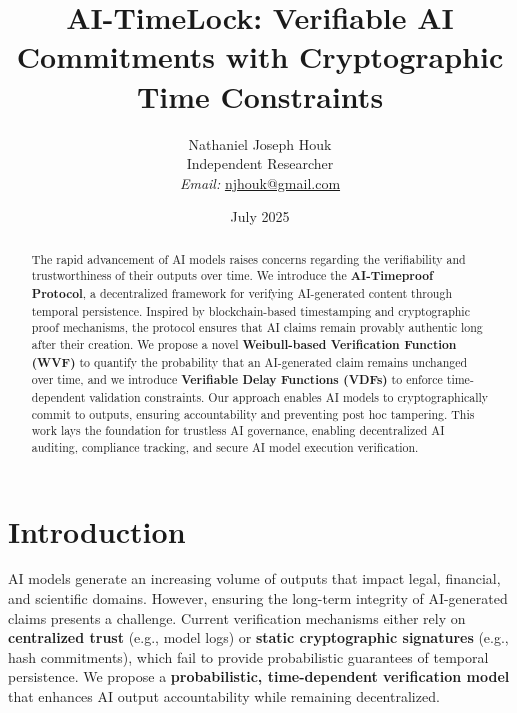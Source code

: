 \documentclass[12pt]{report}
\begin{document}
\title{AI-TimeLock: Verifiable AI Commitments with Cryptographic Time Constraints}
\author{Nathaniel Joseph Houk\\
Independent Researcher\\
\textit{Email:} \href{mailto:njhouk@gmail.com}{njhouk@gmail.com}}
\date{July 2025}
\maketitle

\begin{abstract}
The rapid advancement of AI models raises concerns regarding the verifiability and trustworthiness of their outputs over time. We introduce the \textbf{AI-Timeproof Protocol}, a decentralized framework for verifying AI-generated content through temporal persistence. Inspired by blockchain-based timestamping and cryptographic proof mechanisms, the protocol ensures that AI claims remain provably authentic long after their creation. We propose a novel \textbf{Weibull-based Verification Function (WVF)} to quantify the probability that an AI-generated claim remains unchanged over time, and we introduce \textbf{Verifiable Delay Functions (VDFs)} to enforce time-dependent validation constraints. Our approach enables AI models to cryptographically commit to outputs, ensuring accountability and preventing post hoc tampering. This work lays the foundation for trustless AI governance, enabling decentralized AI auditing, compliance tracking, and secure AI model execution verification.
\end{abstract}

\section{Introduction}

AI models generate an increasing volume of outputs that impact legal, financial, and scientific domains. However, ensuring the long-term integrity of AI-generated claims presents a challenge. Current verification mechanisms either rely on \textbf{centralized trust} (e.g., model logs) or \textbf{static cryptographic signatures} (e.g., hash commitments), which fail to provide probabilistic guarantees of temporal persistence. We propose a \textbf{probabilistic, time-dependent verification model} that enhances AI output accountability while remaining decentralized.
\end{document}
